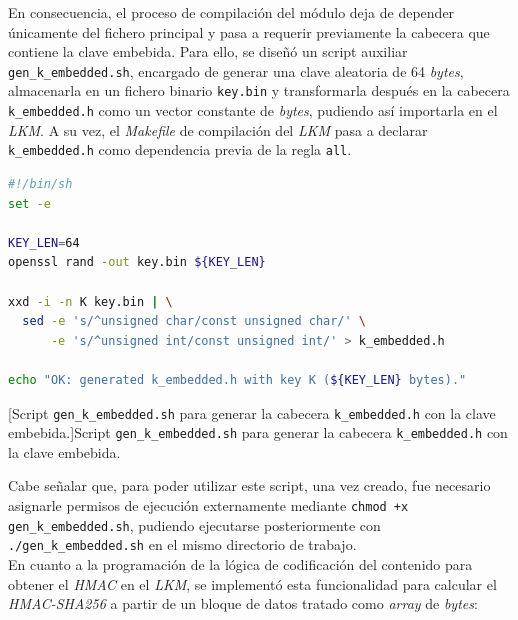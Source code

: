 En consecuencia, el proceso de compilación del módulo deja de depender únicamente del fichero principal y pasa a requerir previamente la cabecera que contiene la clave embebida.
Para ello, se diseñó un script auxiliar \verb|gen_k_embedded.sh|, encargado de generar una clave aleatoria de 64 \textit{bytes}, almacenarla en un fichero binario \verb|key.bin| y transformarla después en la cabecera \verb|k_embedded.h| como un vector constante de \textit{bytes}, pudiendo así importarla en el \textit{LKM}.
A su vez, el \textit{Makefile} de compilación del \textit{LKM} pasa a declarar \verb|k_embedded.h| como dependencia previa de la regla \verb|all|.\\

\begin{lstlisting}[language=sh]
#!/bin/sh
set -e

KEY_LEN=64
openssl rand -out key.bin ${KEY_LEN}

xxd -i -n K key.bin | \
  sed -e 's/^unsigned char/const unsigned char/' \
      -e 's/^unsigned int/const unsigned int/' > k_embedded.h

echo "OK: generated k_embedded.h with key K (${KEY_LEN} bytes)."
\end{lstlisting}
\captionsetup{type=code,justification=centering,singlelinecheck=false}
\captionof{code}[Script \texttt{gen\_k\_embedded.sh} para generar la cabecera \texttt{k\_embedded.h} con la clave embebida.]{Script \texttt{gen\_k\_embedded.sh} para generar la cabecera \texttt{k\_embedded.h} con la clave embebida.}
\label{cod:gen_k_embedded}
\vspace{\baselineskip}

Cabe señalar que, para poder utilizar este script, una vez creado, fue necesario asignarle permisos de ejecución externamente mediante \verb|chmod +x gen_k_embedded.sh|, pudiendo ejecutarse posteriormente con \verb|./gen_k_embedded.sh| en el mismo directorio de trabajo.\\

En cuanto a la programación de la lógica de codificación del contenido para obtener el \textit{HMAC} en el \textit{LKM}, se implementó esta funcionalidad para calcular el \textit{HMAC-SHA256} a partir de un bloque de datos tratado como \textit{array} de \textit{bytes}:

